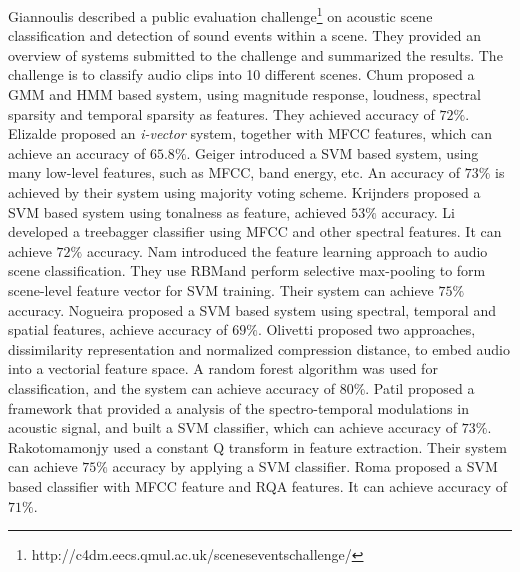 Giannoulis \et\cite{6701819} described a public evaluation challenge\footnote{http://c4dm.eecs.qmul.ac.uk/sceneseventschallenge/} on acoustic scene classification and detection of sound events within a scene. They provided an overview of systems submitted to the challenge and summarized the results. The challenge is to classify audio clips into 10 different scenes. 
Chum \et\cite{chumieee} proposed a GMM and HMM based system, using magnitude response, loudness, spectral sparsity and temporal sparsity as features. They achieved accuracy of $72\%$. 
Elizalde \et\cite{elizaldevector} proposed an {\em i-vector} system\cite{dehak2009support,5947437}, together with MFCC features, which can achieve an accuracy of $65.8\%$. 
Geiger \et\cite{geigerrecognising} introduced a SVM based system, using many low-level features, such as MFCC, band energy, etc. An accuracy of $73\%$ is achieved by their system using majority voting scheme. 
Krijnders \et\cite{krijnders400tone} proposed a SVM based system using tonalness as feature, achieved $53\%$ accuracy. 
Li \et\cite{liauditory} developed a treebagger classifier using MFCC and other spectral features. It can achieve $72\%$ accuracy. 
Nam \et\cite{namacoustic} introduced the feature learning approach to audio scene classification. They use RBM\cite{lee2007sparse}and perform selective max-pooling to form scene-level feature vector for SVM training. Their system can achieve $75\%$ accuracy. 
Nogueira \et\cite{nogueirasound} proposed a SVM based system using spectral, temporal and spatial features, achieve accuracy of $69\%$. 
Olivetti \cite{emanuele} proposed two approaches, dissimilarity representation and normalized compression distance, to embed audio into a vectorial feature space. A random forest\cite{rf} algorithm was used for classification, and the system can achieve accuracy of $80\%$. 
Patil \et\cite{patil2002multiresolution} proposed a framework that provided a analysis of the spectro-temporal modulations in acoustic signal, and built a SVM classifier, which can achieve accuracy of $73\%$. 
Rakotomamonjy \et\cite{rakotomamonjy} used a constant Q transform in feature extraction. Their system can achieve $75\%$ accuracy by applying a SVM classifier.
Roma \et\cite{romarecurrence} proposed a SVM based classifier with MFCC feature and RQA\cite{zbilut2006recurrence} features. It can achieve accuracy of $71\%$.


